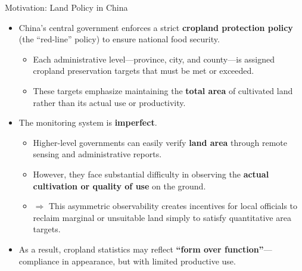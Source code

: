 \documentclass[10pt, xcolor=x11names,compress, aspectratio=169]{beamer}
\begin{document}
\begin{frame}{Motivation: Land Policy in China}

\begin{itemize}
    \item China’s central government enforces a strict \textbf{cropland protection policy} (the ``red-line'' policy) to ensure national food security.
    \begin{itemize}
        \item Each administrative level---province, city, and county---is assigned cropland preservation targets that must be met or exceeded.
        \item These targets emphasize maintaining the \textbf{total area} of cultivated land rather than its actual use or productivity.
    \end{itemize}

    \vspace{1em}

    \item The monitoring system is \textbf{imperfect}.
    \begin{itemize}
        \item Higher-level governments can easily verify \textbf{land area} through remote sensing and administrative reports.
        \item However, they face substantial difficulty in observing the \textbf{actual cultivation or quality of use} on the ground.
        \item $\Rightarrow$ This asymmetric observability creates incentives for local officials to reclaim marginal or unsuitable land simply to satisfy quantitative area targets.
    \end{itemize}

    \vspace{1em}

    \item As a result, cropland statistics may reflect \textbf{``form over function''}---compliance in appearance, but with limited productive use.
\end{itemize}

\end{frame}
\end{document}
